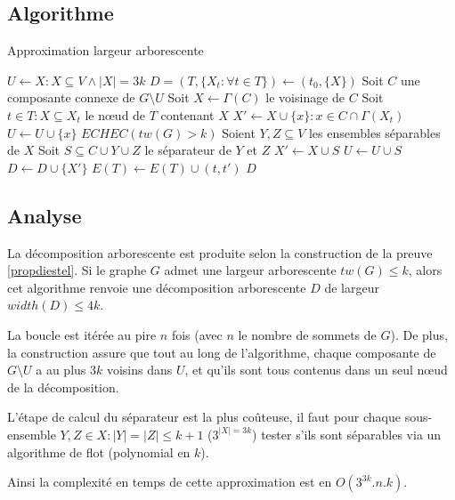 
\subsection{Algorithme}
\label{algo}
\begin{center}
\begin{algorithm}[H]
\caption{Approximation largeur arborescente}\label{algo_tw}
\begin{algorithmic}[1]
	\STATE $U \leftarrow X : X \subseteq V \wedge |X| = 3k$
	\STATE $D = (T,\{X_t : \forall t \in T\}) \leftarrow (t_0,\{X\})$
		\STATE Soit $C$ une composante connexe de $G \setminus U$
		\STATE Soit $X \leftarrow \Gamma(C)$ le voisinage de $C$
		\STATE Soit $t \in T : X \subseteq X_t$ le n\oe ud de $T$ contenant $X$
			\STATE $X' \leftarrow X \cup \{x\} : x \in C \cap \Gamma(X_t)$
			\STATE $U \leftarrow U \cup \{x\}$
		\ELSE
				\RETURN $ECHEC (tw(G) > k)$
			\ELSE
				\STATE Soient $Y,Z \subseteq V$ les ensembles séparables
				de $X$
				\STATE Soit $S \subseteq C \cup Y \cup Z$ le séparateur de $Y$ et $Z$
				\STATE $X' \leftarrow X \cup S$
				\STATE $U \leftarrow U \cup S$
			\ENDIF
		\ENDIF
		\STATE $D \leftarrow D \cup \{X'\}$
		\STATE $E(T) \leftarrow E(T) \cup (t,t')$
	\ENDWHILE
	\RETURN $D$
\end{algorithmic}
\end{algorithm}
\end{center}

\subsection{Analyse}
\label{analyse}
La décomposition arborescente est produite selon la construction de la preuve \ref{propdiestel}.
Si le graphe $G$ admet une largeur arborescente $tw(G) \leq k$,
alors cet algorithme renvoie une décomposition arborescente $D$ de largeur $width(D) \leq 4k$.

La boucle est itérée au pire $n$ fois (avec $n$ le nombre de sommets de $G$).%
De plus, la construction assure que tout au long de l'algorithme, chaque composante de $G \setminus U$
a au plus $3k$ voisins dans $U$, et qu'ils sont tous contenus dans un seul n\oe ud de la décomposition.

L'étape de calcul du séparateur est la plus coûteuse, il faut pour 
chaque sous-ensemble $Y,Z \in X : |Y| = |Z| \leq k + 1$ ($3^{|X| = 3k}$) tester
s'ils sont séparables via un algorithme de flot (polynomial en $k$).

Ainsi la complexité en temps de cette approximation est en $O(3^{3k}.n.k)$.

